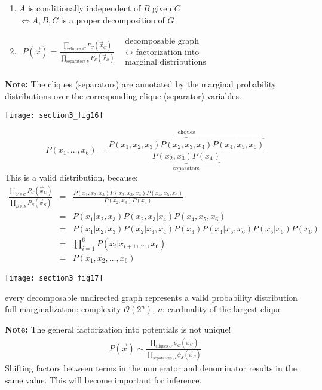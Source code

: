 \begin{enumerate}[(1)]
\item $A$ is conditionally independent of $B$ given $C$ \\
$\Leftrightarrow A,B,C$ is a proper decomposition of $G$
\item $\begin{array}{ll}
	P(\vec{x}) = \frac{ \prod\limits_{\text{cliques }C} P_C(\vec{x}_C) }{
			\prod\limits_{\text{separators }S} P_S(\vec{x}_S)}
	& \substack{\text{decomposable graph} \\
		\longleftrightarrow \text{ factorization into} \\
			\text{marginal distributions}}
\end{array} $
\end{enumerate}
\textbf{Note:} The cliques (separators) are annotated by the marginal
probability distributions over the corresponding clique (separator)
variables.
\begin{center} \texttt{[image: section3\_fig16]} \end{center}
\begin{equation}\label{eq:marginalRepresentation}
	P(x_1, \ldots, x_6) = \frac{ \overbrace{ P(x_1, x_2, x_3) 
					P(x_2, x_3, x_4) P(x_4, x_5, x_6)}^{
						\text{cliques}}}{
				\underbrace{P(x_2, x_3)P(x_4)}_{
					\text{separators}}}
\end{equation}
This is a valid distribution, because:
\begin{eqnarray*}
\frac{ \prod_{C \in \mathcal{C}} P_C(\vec{x}_C) }{
			\prod_{S \in \mathcal{S}} P_S(\vec{x}_S)}
& = & \frac{ P(x_1, x_2, x_3) P(x_2, x_3, x_4) P(x_4, x_5, x_6)}{P(x_2, x_3)P(x_4)} \\
 & = &  P(x_1|x_2,x_3) P(x_2,x_3|x_4) P(x_4,x_5,x_6) \\
  & = & P(x_1|x_2,x_3) P(x_2|x_3,x_4) P(x_3) P(x_4|x_5,x_6) P(x_5|x_6) P(x_6) \\
  & = & \prod\limits_{i=1}^6 P(x_i|x_{i+1}, \ldots, x_6) \\
  & = & P(x_1, x_2, \ldots, x_6)
\end{eqnarray*}
\begin{center} \texttt{[image: section3\_fig17]} \end{center}
\begin{itemize}
	\itr every decomposable undirected graph represents a valid probability 
		distribution
	\itr full marginalization: complexity $\mathcal{O}(2^n)$, $n$: cardinality of the 
		largest clique
\end{itemize}
\textbf{Note:} The general factorization into potentials is not unique!
\begin{equation}
	\begin{array}{ll}
		P(\vec{x}) \sim \frac{\prod\limits_{\text{cliques }C} 
					\psi_C (\vec{x}_C)}{
				\prod\limits_{\text{separators }S} 
					\psi_S (\vec{x}_S)} 

	\end{array}
\end{equation}
Shifting factors between terms in the numerator and denominator
results in the same value. This will become important for inference.

